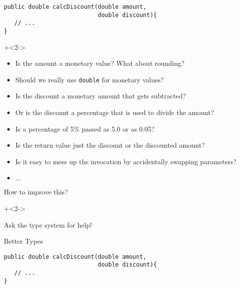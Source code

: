\begin{frame}[fragile]{}

\begin{lstlisting}
public double calcDiscount(double amount, 
                           double discount){
   // ...
}
\end{lstlisting}

\onslide+<2->

\begin{itemize}
\item Is the amount a monetary value? What about rounding?
\item Should we really use \texttt{double} for monetary values?
\item Is the discount a monetary amount that gets subtracted?
\item Or is the discount a percentage that is used to divide the amount?
\item Is a percentage of 5\% passed as 5.0 or as 0.05?
\item Is the return value just the discount or the discounted amount?
\item Is it easy to mess up the invocation by accidentally swapping parameters?
\item $\ldots$
\end{itemize}

\end{frame}


\begin{frame}[fragile]{How to improve this?}

\onslide+<2->

{
\huge
Ask the type system for help!
}


\end{frame}

\begin{frame}[fragile]{Better Types}

\begin{lstlisting}
public double calcDiscount(double amount, 
                           double discount){
   // ...
}
\end{lstlisting}


\end{frame}


